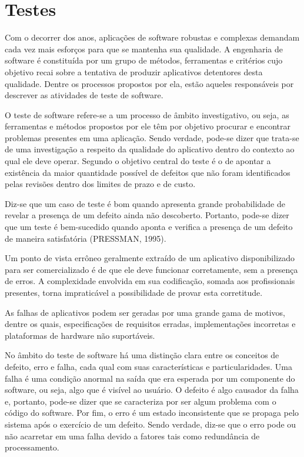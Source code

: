 \section{Testes}
Com o decorrer dos anos, aplicações de software robustas e complexas demandam cada vez mais esforços para que se mantenha sua qualidade. A engenharia de software é constituída por um grupo de métodos, ferramentas e critérios cujo objetivo recai sobre a tentativa de produzir aplicativos detentores desta qualidade. Dentre os processos propostos por ela, estão aqueles responsáveis por descrever as atividades de teste de software.
   
O teste de software refere-se a um processo de âmbito investigativo, ou seja, as ferramentas e métodos propostos  por ele têm por objetivo procurar e encontrar problemas presentes em  uma aplicação. Sendo verdade, pode-se dizer que trata-se de uma investigação a respeito da qualidade do aplicativo dentro do contexto ao qual ele deve operar. Segundo \cite{bib:testes_pressman} o objetivo central do teste é o de apontar a existência da maior quantidade possível de defeitos que  não foram identificados pelas revisões dentro dos limites de prazo e de custo.

Diz-se que um caso de teste é bom quando apresenta grande probabilidade de revelar a presença de um defeito ainda não descoberto. Portanto, pode-se dizer que um teste é bem-sucedido quando aponta e verifica a presença de um defeito de maneira satisfatória (PRESSMAN, 1995). 
 
Um ponto de vista errôneo geralmente extraído de um aplicativo disponibilizado para ser comercializado é de que ele deve funcionar corretamente, sem a presença de erros. A complexidade envolvida em sua codificação, somada aos profissionais presentes, torna impraticável a possibilidade de provar esta corretitude.
 
As falhas de aplicativos podem ser geradas por uma grande gama de motivos, dentre os quais, especificações de requisitos erradas, implementações incorretas e plataformas de hardware não suportáveis. 

No âmbito do teste de software há uma distinção clara entre os conceitos de defeito, erro e falha, cada qual com suas características e particularidades. Uma falha é uma condição anormal na saída que era esperada por um componente do software, ou seja, algo que é visível ao usuário. O defeito é algo causador da falha e, portanto, pode-se dizer que se caracteriza por ser algum problema com o código do software. Por fim, o erro é um estado inconsistente que se propaga pelo sistema após o exercício de um defeito. Sendo verdade, diz-se que o erro pode ou não acarretar em uma falha devido a fatores tais como redundância de processamento.

